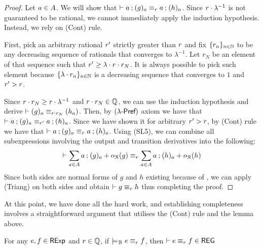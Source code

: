 \begin{proof}
Let $a \in {A}$. We will show that $\vdash a\mathbin{;} (g)_a \equiv_{r} a \mathbin{;} (h)_a $. Since $r \cdot \lambda^{-1}$ is not guaranteed to be rational, we cannot immediately apply the induction hypothesis. Instead, we rely on \textsf{(Cont)} rule. 

First, pick an arbitrary rational $r'$ strictly greater than $r$ and fix $\{r_n\}_{n \in \mathbb{N}}$ to be any decreasing sequence of rationals that converges to $\lambda^{-1}$. Let $r_N$ be an element of that sequence such that $r' \geq \lambda \cdot r \cdot r_N$. It is always possible to pick such element because $\{\lambda \cdot r_n\}_{n \in \mathbb{N}}$ is a decreasing sequence that converges to $1$ and $r' > r$. 

Since $r \cdot r_N \geq r \cdot \lambda^{-1}$ and $r \cdot r_{N} \in \mathbb{Q}$, we can use the induction hypothesis and derive $\vdash (g)_a \equiv_{r \cdot r_{N}} (h_a)$. Then, by $(\textsf{$\lambda$-Pref})$ axiom we have that $\vdash a \mathbin{;} (g)_a \equiv_{r'} a \mathbin{;} (h)_a$. Since we have shown it for arbitrary $r' > r$, by \textsf{(Cont)} rule we have that $\vdash a\mathbin{;} (g)_a \equiv_{r} a \mathbin{;} (h)_a $. Using \textsf{(SL5)}, we can combine all subexpressions involving the output and transition derivatives into the following:
	$$
	\vdash \sum_{a \in {A}} a \mathbin{;} (g)_a + o_{\mathcal{R}}(g) \equiv_{r} \sum_{a \in {A}} a \mathbin{;} (h)_a + o_{\mathcal{R}}(h)
	$$
	Since both sides are normal forms of $g$ and $h$ existing because of , we can apply \textsf{(Triang)} on both sides and obtain $\vdash g \equiv_{r} h$ thus completing the proof.
\end{proof}
At this point, we have done all the hard work, and establishing completeness involves a straightforward argument that utilises the \textsf{(Cont)} rule and the lemma above.
\begin{theorem}[Completeness]\label{c2:completeness}
       For any $e, f \in \mathsf{RExp}$ and $r \in \mathbb{Q}$, if $\models_{\mathcal{B}} e \equiv_r f$, then $\vdash e \equiv_r f \in \mathsf{REG}$
\end{theorem}
